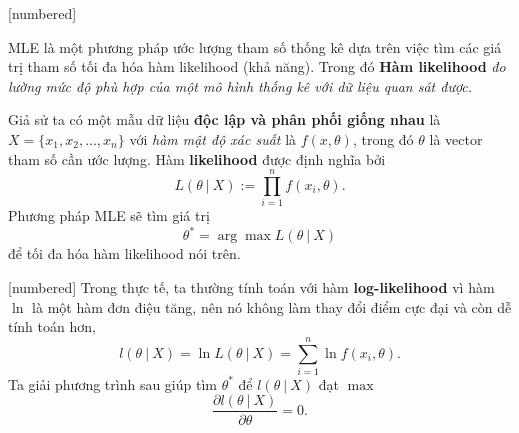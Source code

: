 \begin{frame}[allowframebreaks=2]
\transboxout
{}[numbered]
\begin{remark*}
MLE là một phương pháp ước lượng tham số thống kê dựa trên việc tìm các giá trị tham số tối đa hóa hàm likelihood (khả năng). Trong đó \textbf{Hàm likelihood} \textit{đo lường mức độ phù hợp của một mô hình thống kê với dữ liệu quan sát được.}
\end{remark*}

Giả sử ta có một mẫu dữ liệu \textbf{độc lập và phân phối giống nhau} là $X = \{x_1,x_2,\ldots,x_n\}$ với \textit{hàm mật độ xác suất} là $f(x,\theta)$, trong đó $\theta$ là vector tham số cần ước lượng. Hàm \textbf{likelihood} được định nghĩa bởi
\[L(\theta~|~X):= \prod_{i=1}^{n}f(x_i,\theta).\]
Phương pháp MLE sẽ tìm giá trị 
\[\theta^* = \arg\max L(\theta~|~X)\] 
để tối đa hóa hàm likelihood nói trên.
\pause
\end{frame}

\begin{frame}[allowframebreaks=2]
\transboxout
{}[numbered]
Trong thực tế, ta thường tính toán với hàm \textbf{log-likelihood} vì hàm $\ln$ là một hàm đơn điệu tăng, nên nó không làm thay đổi điểm cực đại và còn dễ tính toán hơn,
\[l(\theta~|~X) = \ln{L(\theta~|~X)} = \sum_{i=1}^n{\ln{f(x_i,\theta)}}.\]
Ta giải phương trình sau giúp tìm $\theta^*$ để $l(\theta~|~X)$ đạt $\max$
\[\dfrac{\partial l(\theta~|~X)}{\partial \theta} = 0.\]
\pause
\end{frame}

